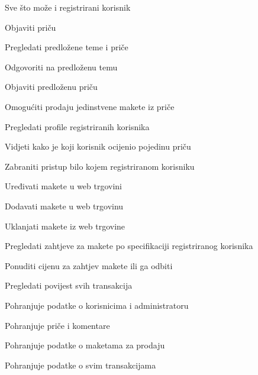 \begin{packed_enum}
\begin{packed_enum}
				\end{packed_enum}
							\item  {}
			
				\begin{packed_enum}
					
					\item Sve što može i registrirani korisnik
					\item Objaviti priču
					\item Pregledati predložene teme i priče
					\item Odgovoriti na predloženu temu
					\item Objaviti predloženu priču
					\item Omogućiti prodaju jedinstvene makete iz priče
					\item Pregledati profile registriranih korisnika
					\item Vidjeti kako je koji korisnik ocijenio pojedinu priču
					\item Zabraniti pristup bilo kojem registriranom korisniku
					\item Uređivati makete u web trgovini
					\item Dodavati makete u web trgovinu
					\item Uklanjati makete iz web trgovine
					\item Pregledati zahtjeve za makete po specifikaciji registriranog korisnika
					\item Ponuditi cijenu za zahtjev makete ili ga odbiti
					\item Pregledati povijest svih transakcija
					
				\end{packed_enum}
							\item  {}
		
				\begin{packed_enum}
					
					\item Pohranjuje podatke o korisnicima i administratoru
					\item Pohranjuje priče i komentare
					\item Pohranjuje podatke o maketama za prodaju
					\item Pohranjuje podatke o svim transakcijama
					
				\end{packed_enum}
			\end{packed_enum}
			
			\eject 
			
